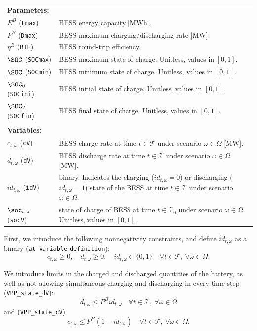 \begin{tabularx}{\textwidth}{l X}

\textbf{Parameters:} \\
$E^B$ (\texttt{Emax}) & BESS energy capacity [MWh]. \\ 
$P^B$ (\texttt{Dmax}) & BESS maximum charging/discharging rate [MW]. \\ 
$\eta^B$ (\texttt{RTE}) & BESS round-trip efficiency. \\ 
$\overline{\SOC}$ (\texttt{SOCmax}) & BESS maximum state of charge. Unitless, values in $[0, 1]$. \\ 
$\underline{\SOC}$ (\texttt{SOCmin}) & BESS minimum state of charge. Unitless, values in $[0, 1]$. \\ 
$\SOC_0$ (\texttt{SOCini}) & BESS initial state of charge. Unitless, values in $[0, 1]$. \\ 
$\SOC_T$ (\texttt{SOCfin}) & BESS final state of charge. Unitless, values in $[0, 1]$. \\
\\
\textbf{Variables:} \\
$c_{t, \omega}$ (\texttt{cV}) & BESS charge rate at time $t \in \mathcal{T}$ under scenario $\omega \in \Omega$ [MW]. \\ 
$d_{t, \omega}$ (\texttt{dV}) & BESS discharge rate at time $t \in \mathcal{T}$ under scenario $\omega \in \Omega$ [MW]. \\ 
$id_{t, \omega}$ (\texttt{idV}) & binary. Indicates the charging ($id_{t, \omega} = 0$) or discharging ($id_{t, \omega}= 1$) state of the BESS at time $t \in \mathcal{T}$ under scenario $\omega \in \Omega$. \\ 
$\soc_{t, \omega}$ (\texttt{socV}) & state of charge of BESS at time $t \in \mathcal{T}_0$ under scenario $\omega \in \Omega$. Unitless, values in $[0, 1]$. \\
\end{tabularx}

First, we introduce the following nonnegativity  constraints, and define $id_{t, \omega}$ as a binary (\verb|at variable| \verb|definition|):
\begin{equation} \label{dVdCPos}
	c_{t, \omega} \geq 0, \quad d_{t, \omega} \geq 0, \quad id_{t, \omega} \in \{ 0, 1 \} \quad \forall t \in \mathcal{T}, \ \forall \omega \in \Omega.
\end{equation}

We introduce limits in the charged and discharged quantities of the battery, as well as not allowing simultaneous charging and discharging in every time step (\verb|VPP_state_dV|):
\begin{equation} \label{EQ:VPP_state_dV}
	d_{t, \omega} \leq P^B id_{t, \omega} \quad \forall t \in \mathcal{T}, \ \forall \omega \in \Omega
\end{equation}
and (\verb|VPP_state_cV|)
\begin{equation} \label{EQ:VPP_state_cV}
	c_{t, \omega} \leq P^B (1 - id_{t, \omega}) \quad \forall t \in \mathcal{T}, \ \forall \omega \in \Omega.
\end{equation}

